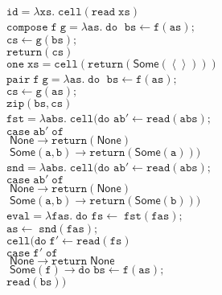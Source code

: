 \documentclass[preprint]{sigplanconf}
\newcommand{\term}[1]{\ensuremath{\mathtt{{#1}}}}
\newcommand{\unitval}{\left<\right>}
\newcommand{\None}{\mathsf{None}}
\newcommand{\Some}[1]{\mathsf{Some}({#1})}
\begin{document}
\begin{figure}
\begin{tabbing}
\term{id = \lambda xs.\;cell(read\;xs)} 
\\[1em]

\term{compose\;f\;g =\lambda as.\; do\;}
 \=\term{bs \leftarrow f(as);} \\
 \>\term{cs \leftarrow g(bs);} \\
 \>\term{return(cs)} 
\\[1em]

\term{one\;xs = cell(return(\Some{\unitval}))}
\\[1em]

\term{pair\;f\;g = \lambda as.\;do\;}
  \=\term{bs \leftarrow f(as);} \\
  \>\term{cs \leftarrow g(as);} \\
  \>\term{zip(bs,cs)}
\\[1em]

\term{fst = \lambda abs.\;cell(do}
  \= \term{ab' \leftarrow read(abs);} \\
  \>\term{case \; ab'\; of} \\
  \>\term{\;\None \to return(\None)} \\
  \>\term{\;\Some{a,b} \to return(\Some{a}))} 
\\[1em]


\term{snd = \lambda abs.\;cell(do}
  \= \term{ab' \leftarrow read(abs);} \\
  \>\term{case \; ab'\; of} \\
  \>\term{\;\None \to return(\None)} \\
  \>\term{\;\Some{a,b} \to return(\Some{b}))} 
\\[1em]

\term{eval = \lambda fas.\;do}\;
              \=\term{fs \leftarrow \;fst(fas);}\\
              \>\term{as \leftarrow \;snd(fas);}\\
              \>\term{cell(do\;}\=\term{f' \leftarrow read(fs)}\\
              \>                  \>\term{case\;f'\;of}\\
              \>                  \>\term{\;\None \to return\;\None} \\
              \>                  \>\term{\;\Some{f} \to do\;}\=\term{bs \leftarrow f(as);} \\
              \>                  \>                            \>$\term{read(bs)})$ 
\\[1em]


\end{tabbing}
\end{figure}
\end{document}
